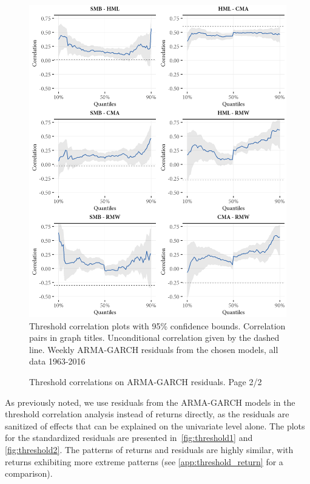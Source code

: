 \begin{figure}[H]
  \caption{Threshold correlations on ARMA-GARCH residuals. Page 2/2}
  \label{fig:threshold2}
  \centering
  \begin{minipage}{\textwidth}
  \includegraphics[scale=1]{graphics/threshold2.png}  
  \vspace{3mm}
  \footnotesize
  Threshold correlation plots with 95\% confidence bounds. Correlation pairs in graph titles. Unconditional correlation given by the dashed line. Weekly ARMA-GARCH residuals from the chosen models, all data 1963-2016
  \end{minipage}
\end{figure}

As previously noted, we use residuals from the ARMA-GARCH models in the threshold correlation analysis instead of returns directly, as the residuals are sanitized of effects that can be explained on the univariate level alone. The plots for the standardized residuals are presented in~\autoref{fig:threshold1} and \autoref{fig:threshold2}. The patterns of returns and residuals are highly similar, with returns exhibiting more extreme patterns (see \autoref{app:threshold_return} for a comparison).

